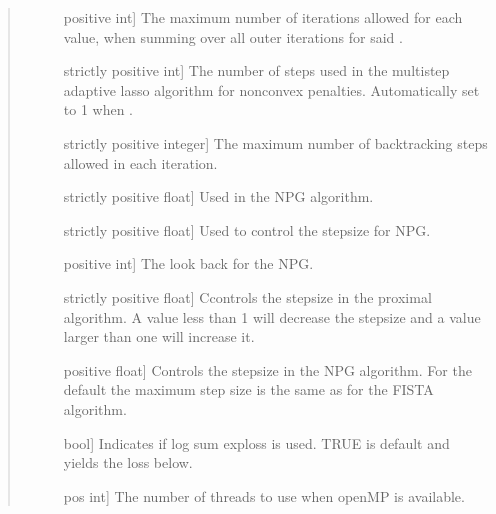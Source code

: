 \documentclass[letterpaper,10pt,english]{sphinxmanual}
\begin{document}
\begin{fulllineitems}
\begin{quote}
\begin{description}
\begin{description}
\item[{}] \leavevmode{[}positive int{]}
\sphinxAtStartPar
The maximum number of  iterations
allowed for each    value, when  summing over all outer iterations
for said   .

\item[{}] \leavevmode{[}strictly positive int{]}
\sphinxAtStartPar
The number of steps used in the multi\sphinxhyphen{}step adaptive lasso algorithm for 
non\sphinxhyphen{}convex penalties. Automatically  set to 1 when   .

\item[{}] \leavevmode{[}strictly positive integer{]}
\sphinxAtStartPar
The maximum number of backtracking steps allowed in each iteration.

\item[{}] \leavevmode{[}strictly positive float{]}
\sphinxAtStartPar
Used in the NPG algorithm.

\item[{}] \leavevmode{[}strictly positive float{]}
\sphinxAtStartPar
Used to control the stepsize for NPG.

\item[{}] \leavevmode{[}positive int{]}
\sphinxAtStartPar
The look back for the NPG.

\item[{}] \leavevmode{[}strictly positive float{]}
\sphinxAtStartPar
Ccontrols the stepsize in the proximal algorithm. A  value less than 1 will decrease 
the stepsize and a value larger than one will increase it.

\item[{}] \leavevmode{[}positive float{]}
\sphinxAtStartPar
Controls the stepsize in the NPG algorithm. For the default  
 the maximum step size is the same
as for the FISTA algorithm.

\item[{}] \leavevmode{[}bool{]}
\sphinxAtStartPar
Indicates if log sum exp\sphinxhyphen{}loss is used.  TRUE is
default and yields the loss below.

\item[{}] \leavevmode{[}pos int{]}
\sphinxAtStartPar
The number of threads to use when  openMP  is available.


\end{description}
\end{description}
\end{quote}
\end{fulllineitems}
\end{document}
